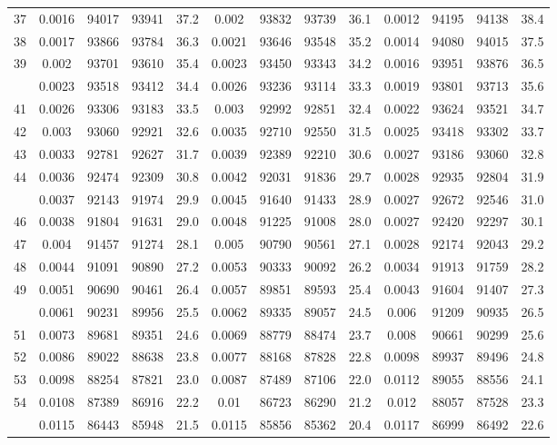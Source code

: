\documentclass[
  14pt,
]{article}
\begin{document}
\begin{longtable}[t]{lcccccccccccc}
37 & 0.0016 & 94017 & 93941 & 37.2 & 0.002 & 93832 & 93739 & 36.1 & 0.0012 & 94195 & 94138 & 38.4\\
38 & 0.0017 & 93866 & 93784 & 36.3 & 0.0021 & 93646 & 93548 & 35.2 & 0.0014 & 94080 & 94015 & 37.5\\
39 & 0.002 & 93701 & 93610 & 35.4 & 0.0023 & 93450 & 93343 & 34.2 & 0.0016 & 93951 & 93876 & 36.5\\
\addlinespace
40 & 0.0023 & 93518 & 93412 & 34.4 & 0.0026 & 93236 & 93114 & 33.3 & 0.0019 & 93801 & 93713 & 35.6\\
41 & 0.0026 & 93306 & 93183 & 33.5 & 0.003 & 92992 & 92851 & 32.4 & 0.0022 & 93624 & 93521 & 34.7\\
42 & 0.003 & 93060 & 92921 & 32.6 & 0.0035 & 92710 & 92550 & 31.5 & 0.0025 & 93418 & 93302 & 33.7\\
43 & 0.0033 & 92781 & 92627 & 31.7 & 0.0039 & 92389 & 92210 & 30.6 & 0.0027 & 93186 & 93060 & 32.8\\
44 & 0.0036 & 92474 & 92309 & 30.8 & 0.0042 & 92031 & 91836 & 29.7 & 0.0028 & 92935 & 92804 & 31.9\\
\addlinespace
45 & 0.0037 & 92143 & 91974 & 29.9 & 0.0045 & 91640 & 91433 & 28.9 & 0.0027 & 92672 & 92546 & 31.0\\
46 & 0.0038 & 91804 & 91631 & 29.0 & 0.0048 & 91225 & 91008 & 28.0 & 0.0027 & 92420 & 92297 & 30.1\\
47 & 0.004 & 91457 & 91274 & 28.1 & 0.005 & 90790 & 90561 & 27.1 & 0.0028 & 92174 & 92043 & 29.2\\
48 & 0.0044 & 91091 & 90890 & 27.2 & 0.0053 & 90333 & 90092 & 26.2 & 0.0034 & 91913 & 91759 & 28.2\\
49 & 0.0051 & 90690 & 90461 & 26.4 & 0.0057 & 89851 & 89593 & 25.4 & 0.0043 & 91604 & 91407 & 27.3\\
\addlinespace
50 & 0.0061 & 90231 & 89956 & 25.5 & 0.0062 & 89335 & 89057 & 24.5 & 0.006 & 91209 & 90935 & 26.5\\
51 & 0.0073 & 89681 & 89351 & 24.6 & 0.0069 & 88779 & 88474 & 23.7 & 0.008 & 90661 & 90299 & 25.6\\
52 & 0.0086 & 89022 & 88638 & 23.8 & 0.0077 & 88168 & 87828 & 22.8 & 0.0098 & 89937 & 89496 & 24.8\\
53 & 0.0098 & 88254 & 87821 & 23.0 & 0.0087 & 87489 & 87106 & 22.0 & 0.0112 & 89055 & 88556 & 24.1\\
54 & 0.0108 & 87389 & 86916 & 22.2 & 0.01 & 86723 & 86290 & 21.2 & 0.012 & 88057 & 87528 & 23.3\\
\addlinespace
55 & 0.0115 & 86443 & 85948 & 21.5 & 0.0115 & 85856 & 85362 & 20.4 & 0.0117 & 86999 & 86492 & 22.6\\

\end{longtable}
\end{document}
